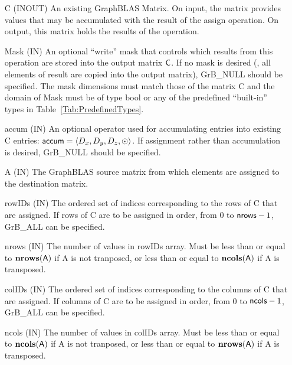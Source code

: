 \begin{itemize}[leftmargin=1in]
    \item[{\sf C}]    ({\sf INOUT}) An existing GraphBLAS Matrix.  On input,
    the matrix provides values that may be accumulated with the result of the
    assign operation.  On output, this matrix holds the results of the
    operation.

    \item[{\sf Mask}]  ({\sf IN}) An optional ``write'' mask that controls which
    results from this operation are stored into the output matrix
    ${\sf C}$.  If no mask is desired (\ie, all elements
    of result are copied into the output matrix), {\sf GrB\_NULL}
    should be specified. The mask dimensions must match those of the
    matrix {\sf C} and the domain of {\sf Mask} must be
    of type {\sf bool} or any of the predefined ``built-in'' types in
    Table~\ref{Tab:PredefinedTypes}.


    \item[{\sf accum}]    ({\sf IN}) An optional operator used for accumulating
    entries into existing {\sf C} entries: ${\sf accum} = \langle D_x,
    D_y, D_z,\odot \rangle$. If assignment rather than accumulation is
    desired, {\sf GrB\_NULL} should be specified.

    \item[{\sf A}]       ({\sf IN}) The GraphBLAS source matrix from which elements are assigned to the destination matrix.
    
    \item[{\sf rowIDs}]  ({\sf IN}) The ordered set of indices corresponding to the 
    rows of {\sf C} that are assigned.  If rows of
    {\sf C} are to be assigned in order, from $0$ to ${\sf nrows} - 1$, {\sf GrB\_ALL} can be specified.
    
    \item[{\sf nrows}] ({\sf IN}) The number of values in {\sf rowIDs} array.
	    Must be less than or equal to $\bold{nrows}({\sf A})$ if {\sf A} is not tranposed,
	    or less than or equal to $\bold{ncols}({\sf A})$ if {\sf A} is transposed.

    \item[{\sf colIDs}]  ({\sf IN}) The ordered set of indices corresponding to the 
    columns of {\sf C} that are assigned.  If columns of
    {\sf C} are to be assigned in order, from $0$ to ${\sf ncols} - 1$, {\sf GrB\_ALL} can be specified.
    
    \item[{\sf ncols}] ({\sf IN}) The number of values in {\sf colIDs} array.
	    Must be less than or equal to $\bold{ncols}({\sf A})$ if {\sf A} is not tranposed,
	    or less than or equal to $\bold{nrows}({\sf A})$ if {\sf A} is transposed.


\end{itemize}
